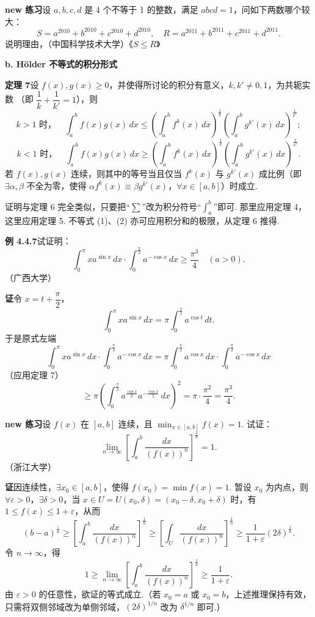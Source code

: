 \documentclass[UTF8,12pt,a4paper,fontset=fandol]{ctexart}
\begin{document}
\noindent\textbf{new 练习}\quad 设 $a,b,c,d$ 是 4 个不等于 1 的整数，满足 $abcd=1$，问如下两数哪个较大：
\[
S=a^{2010}+b^{2010}+c^{2010}+d^{2010},\quad
R=a^{2011}+b^{2011}+c^{2011}+d^{2011}.
\]
说明理由，（中国科学技术大学）\hfill《$S\le R$》

\noindent\textbf{b. Hölder 不等式的积分形式}

\noindent\textbf{定理 7}\quad 设 $f(x),g(x)\ge0$，并使得所讨论的积分有意义，$k,k'\ne0,1$，为共轭实数
（即 $\dfrac1k+\dfrac1{k'}=1$），则
\[
k>1\text{ 时，}\quad
\int_a^b f(x)g(x)\,dx
\le\left(\int_a^b f^k(x)\,dx\right)^{\frac1k}
\left(\int_a^b g^{k'}(x)\,dx\right)^{\frac1{k'}}; \tag{1}
\]
\[
k<1\text{ 时，}\quad
\int_a^b f(x)g(x)\,dx
\ge\left(\int_a^b f^k(x)\,dx\right)^{\frac1k}
\left(\int_a^b g^{k'}(x)\,dx\right)^{\frac1{k'}}. \tag{2}
\]
若 $f(x),g(x)$ 连续，则其中的等号当且仅当 $f^k(x)$ 与 $g^{k'}(x)$ 成比例（即 $\exists\alpha,\beta$ 不全为零，使得
$\alpha f^k(x)\equiv\beta g^{k'}(x)$，$\forall x\in[a,b]$）时成立.

证明与定理 6 完全类似，只要把“$\sum$”改为积分符号“$\displaystyle\int_a^b$”即可. 那里应用定理 4，这里应用定理 5.
不等式 (1)、(2) 亦可应用积分和的极限，从定理 6 推得.

\noindent\textbf{例 4.4.7}\quad 试证明：
\[
\int_0^\pi x a^{\sin x}\,dx\cdot\int_0^{\frac\pi2}a^{-\cos x}\,dx
\ge\frac{\pi^3}4\quad(a>0). \tag{1}
\]
（广西大学）

\noindent\textbf{证}\quad 令 $x=t+\dfrac\pi2$，
\[
\int_0^\pi x a^{\sin x}\,dx
=\pi\int_0^{\frac\pi2}a^{\cos t}\,dt.
\]
于是原式左端
\[
\int_0^\pi x a^{\sin x}\,dx\cdot\int_0^{\frac\pi2}a^{-\cos x}\,dx
=\pi\int_0^{\frac\pi2}a^{\cos x}\,dx\cdot\int_0^{\frac\pi2}a^{-\cos x}\,dx
\]
（应用定理 7）
\[
\ge \pi\left(\int_0^{\frac\pi2}a^{\frac{\cos x}{2}}a^{-\frac{\cos x}{2}}\,dx\right)^2
=\pi\cdot\frac{\pi^2}4=\frac{\pi^3}4.
\]

\noindent\textbf{new 练习}\quad 设 $f(x)$ 在 $[a,b]$ 连续，且 $\displaystyle\min_{x\in[a,b]}f(x)=1$. 试证：
\[
\lim_{n\to\infty}\left[\int_a^b\frac{dx}{(f(x))^n}\right]^{\frac1n}=1.
\]
（浙江大学）

\noindent\textbf{证}\quad 因连续性，$\exists x_0\in[a,b]$，使得 $f(x_0)=\min f(x)=1$.
暂设 $x_0$ 为内点，则 $\forall\varepsilon>0$，$\exists\delta>0$，当
$x\in U=U(x_0,\delta)=(x_0-\delta,x_0+\delta)$ 时，有 $1\le f(x)\le1+\varepsilon$，从而
\[
(b-a)^{\frac1n}\ge
\left[\int_a^b\frac{dx}{(f(x))^n}\right]^{\frac1n}
\ge \left[\int_U\frac{dx}{(f(x))^n}\right]^{\frac1n}
\ge \frac1{1+\varepsilon}(2\delta)^{\frac1n}.
\]
令 $n\to\infty$，得
\[
1\ge\lim_{n\to\infty}\left[\int_a^b\frac{dx}{(f(x))^n}\right]^{\frac1n}
\ge\frac1{1+\varepsilon}.
\]
由 $\varepsilon>0$ 的任意性，欲证的等式成立.（若 $x_0=a$ 或 $x_0=b$，上述推理保持有效，只需将双侧邻域改为单侧邻域，$(2\delta)^{1/n}$ 改为 $\delta^{1/n}$ 即可.）
\end{document}
